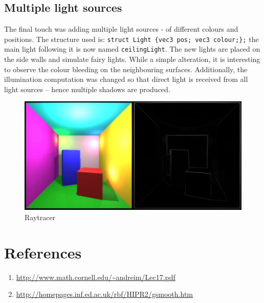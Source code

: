 \documentclass[DIV=calc, paper=a4, fontsize=11pt, twocolumn]{article}	 %
\begin{document}
	\subsection*{Multiple light sources}
	The final touch was adding multiple light sources - of different colours and positions. The structure used is: \texttt{struct Light \{vec3 pos; vec3 colour;\};} the main light following it is now named \texttt{ceilingLight}. The new lights are placed on the side walls and simulate fairy lights. While a simple alteration, it is interesting to observe the colour bleeding on the neighbouring surfaces. Additionally, the illumination computation was changed so that direct light is received from all light sources -- hence multiple shadows are produced.
	\begin{figure}[!htp]
		\begin{minipage}{.95\linewidth}
			\includegraphics[width=\linewidth]{raytracer_final.jpg}
			\captionsetup{belowskip=4pt,aboveskip=-11pt}
			\caption{Raytracer}
			\label{graph}
		\end{minipage}
	\end{figure}
	

	\section*{References}
	\begin{enumerate}
		\item \url{http://www.math.cornell.edu/~andreim/Lec17.pdf}
		\item \url{http://homepages.inf.ed.ac.uk/rbf/HIPR2/gsmooth.htm}
	\end{enumerate}
 
\end{document}
